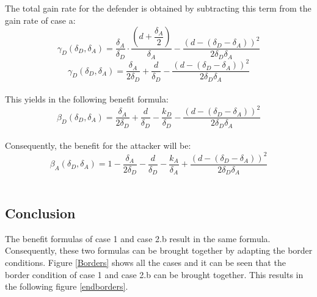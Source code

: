 The total gain rate for the defender is obtained by subtracting this term from the gain rate of case a:
 \begin{equation*}
\gamma_{D}(\delta_{D},\delta_{A}) = \dfrac{\delta_{A}}{\delta_{D}} \cdot \dfrac{(d+\dfrac{\delta_{A}}{2})}{\delta_{A}} - \dfrac{(d - (\delta_{D} - \delta_{A}))^{2}}{2 \delta_{D} \delta_{A}}
\end{equation*}
\begin{equation*}
\gamma_{D}(\delta_{D},\delta_{A}) = \dfrac{\delta_{A}}{2\delta_{D}} + \dfrac{d}{\delta_{D}} - \dfrac{(d - (\delta_{D} - \delta_{A}))^{2}}{2 \delta_{D} \delta_{A}}
\end{equation*}\\
This yields in the following benefit formula:
\begin{equation}\label{benfcase2b:defender}
\beta_{D}(\delta_{D},\delta_{A}) = \dfrac{\delta_{A}}{2\delta_{D}} + \dfrac{d}{\delta_{D}} - \dfrac{k_{D}}{ \delta_{D}} - \dfrac{(d - (\delta_{D} - \delta_{A}))^{2}}{2 \delta_{D} \delta_{A}}
\end{equation}\\
 
Consequently, the benefit for the attacker will be:
\begin{equation}\label{benfcase2b:attacker}
\beta_{A}(\delta_{D},\delta_{A}) = 1 -\dfrac{\delta_{A}}{2\delta_{D}} - \dfrac{d}{\delta_{D}} - \dfrac{k_{A}}{ \delta_{A}} + \dfrac{(d - (\delta_{D} - \delta_{A}))^{2}}{2 \delta_{D} \delta_{A}}
\end{equation}\\

\subsection{Conclusion}

The benefit formulas of case 1 and case 2.b result in the same formula. Consequently, these two formulas can be brought together by adapting the border conditions. Figure \ref{Borders} shows all the cases and it can be seen that the border condition of case 1 and case 2.b can be brought together. This results in the following figure \ref{endborders}. \\


